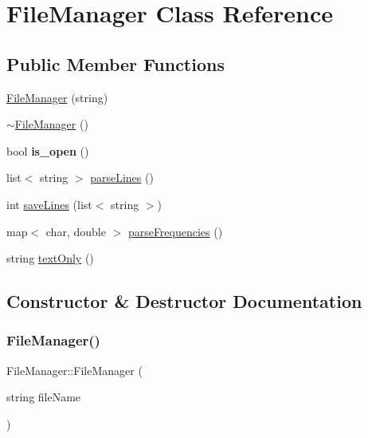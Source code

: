 \hypertarget{classFileManager}{}\section{File\+Manager Class Reference}
\label{classFileManager}
\subsection*{Public Member Functions}
\begin{DoxyCompactItemize}
\item 
\hyperlink{classFileManager_a40ecb9b4c441c5108e25814d8d40824a}{File\+Manager} (string)
\item 
\hyperlink{classFileManager_abaed33b5b0c13b8a597db9335a1aacfa}{$\sim$\+File\+Manager} ()
\item 
\mbox{\label{classFileManager_ab424d7f507a8804d7b8b8557fe481f46}} 
bool {\bfseries is\+\_\+open} ()
\item 
list$<$ string $>$ \hyperlink{classFileManager_abd1d0f98cb32a54435e491f876f73d14}{parse\+Lines} ()
\item 
int \hyperlink{classFileManager_a2ad30e54df4ffd2ca94b316ef43e1b1f}{save\+Lines} (list$<$ string $>$)
\item 
map$<$ char, double $>$ \hyperlink{classFileManager_afb8f7a73be3a7392fc822253aa554531}{parse\+Frequencies} ()
\item 
string \hyperlink{classFileManager_a92cce9f1145aaa39a52f4b991850d741}{text\+Only} ()
\end{DoxyCompactItemize}


\subsection{Constructor \& Destructor Documentation}
\mbox{\label{classFileManager_a40ecb9b4c441c5108e25814d8d40824a}} 
\subsubsection{\texorpdfstring{File\+Manager()}{FileManager()}}
{\footnotesize\ttfamily File\+Manager\+::\+File\+Manager (\begin{DoxyParamCaption}\item[{string}]{file\+Name }\end{DoxyParamCaption})}

